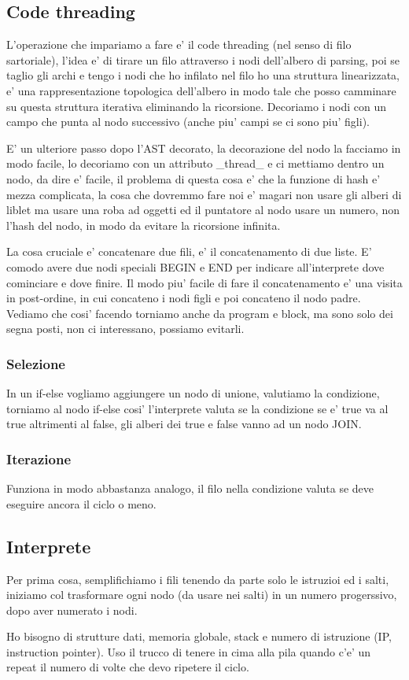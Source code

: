 \subsection{Code threading}
L'operazione che impariamo a fare e' il code threading (nel senso di filo sartoriale), l'idea e' di tirare un filo attraverso i nodi dell'albero di parsing, poi se taglio gli archi e tengo i nodi che ho infilato nel filo ho una struttura linearizzata, e' una rappresentazione topologica dell'albero in modo tale che posso camminare su questa struttura iterativa eliminando la ricorsione.
Decoriamo i nodi con un campo che punta al nodo successivo (anche piu' campi se ci sono piu' figli).

E' un ulteriore passo dopo l'AST decorato, la decorazione del nodo la facciamo in modo facile, lo decoriamo con un attributo \_thread\_ e ci mettiamo dentro un nodo, da dire e' facile, il problema di questa cosa e' che la funzione di hash e' mezza complicata, la cosa che dovremmo fare noi e' magari non usare gli alberi di liblet ma usare una roba ad oggetti ed il puntatore al nodo usare un numero, non l'hash del nodo, in modo da evitare la ricorsione infinita.

La cosa cruciale e' concatenare due fili, e' il concatenamento di due liste.
E' comodo avere due nodi speciali BEGIN e END per indicare all'interprete dove cominciare e dove finire.
Il modo piu' facile di fare il concatenamento e' una visita in post-ordine, in cui concateno i nodi figli e poi concateno il nodo padre. Vediamo che cosi' facendo torniamo anche da program e block, ma sono solo dei segna posti, non ci interessano, possiamo evitarli.

\subsubsection{Selezione}
In un if-else vogliamo aggiungere un nodo di unione, valutiamo la condizione, torniamo al nodo if-else cosi' l'interprete valuta se la condizione se e' true va al true altrimenti al false, gli alberi dei true e false vanno ad un nodo JOIN.

\subsubsection{Iterazione}
Funziona in modo abbastanza analogo, il filo nella condizione valuta se deve eseguire ancora il ciclo o meno.

\subsection{Interprete}
Per prima cosa, semplifichiamo i fili tenendo da parte solo le istruzioi ed i salti, iniziamo col trasformare ogni nodo (da usare nei salti) in un numero progerssivo, dopo aver numerato i nodi.

Ho bisogno di strutture dati, memoria globale, stack e numero di istruzione (IP, instruction pointer).
Uso il trucco di tenere in cima alla pila quando c'e' un repeat il numero di volte che devo ripetere il ciclo.